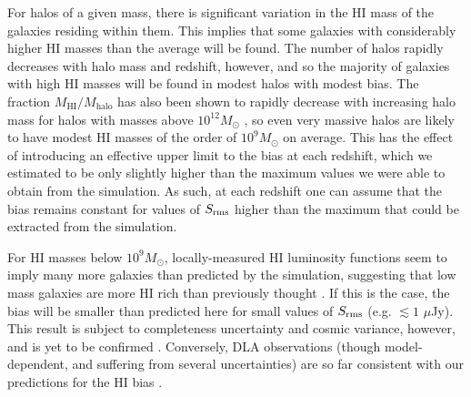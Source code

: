 \documentclass[useAMS,usenatbib]{mn2e}
\begin{document}
For halos of a given mass, there is significant variation in the HI mass of the galaxies residing within them. This implies that some galaxies with considerably higher HI masses than the average will be found. The number of halos rapidly decreases with halo mass and redshift, however, and so the majority of galaxies with high HI masses will be found in modest halos with modest bias. The fraction $M_\mathrm{HI}/M_\mathrm{halo}$ has also been shown to rapidly decrease with increasing halo mass for halos with masses above $10^{12} M_\odot$ \citep{2014arXiv1409.1574P}, so even very massive halos are likely to have modest HI masses of the order of $10^9 M_\odot$ on average. This has the effect of introducing an effective upper limit to the bias at each redshift, which we estimated to be only slightly higher than the maximum values we were able to obtain from the simulation. As such, at each redshift one can assume that the bias remains constant for values of $S_{\rm rms}$ higher than the maximum that could be extracted from the simulation.

For HI masses below $10^9 M_\odot$, locally-measured HI luminosity functions seem to imply many more galaxies than predicted by the simulation, suggesting that low mass galaxies are more HI rich than previously thought \citep{2014arXiv1409.1574P}. If this is the case, the bias will be smaller than predicted here for small values of $S_{\rm rms}$ (e.g. $\lesssim 1$ $\mu$Jy). This result is subject to completeness uncertainty and cosmic variance, however, and is yet to be confirmed \citep{2013ApJ...766..137O}. Conversely, DLA observations (though model-dependent, and suffering from several uncertainties) are so far consistent with our predictions for the HI bias \citep{2012JCAP...11..059F}.
\end{document}
